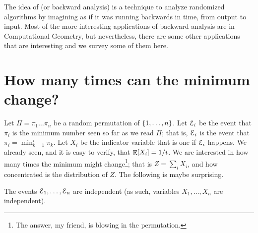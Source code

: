 %


\ChapterPrefix{}
\ChapterGen{}


The idea of  (or backward analysis) is a
technique to analyze randomized algorithms by imagining as if it was
running backwards in time, from output to input. Most of the more
interesting applications of backward analysis are in Computational
Geometry, but nevertheless, there are some other applications that are
interesting and we survey some of them here.


\section{How many times can the minimum change?}


Let $\Pi = \pi_1 \ldots \pi_n$ be a random permutation of
$\left\{ {1, \ldots, n} \right\}$. Let $\EuScript{E}_i$ be the event that $\pi_i$ is the
minimum number seen so far as we read $\Pi$; that is, $\EuScript{E}_i$ is
the event that $\pi_i = \min_{k=1}^i \pi_k$. Let $X_i$ be the
indicator variable that is one if $\EuScript{E}_i$ happens. We already seen,
and it is easy to verify, that $\mathop{\mathbb{E}}\!\left[ {X_i} \right] = 1/i$. We are interested in
how many times the minimum might change\footnote{The answer, my
   friend, is blowing in the permutation.}; that is $Z=\sum_i X_i$,
and how concentrated is the distribution of $Z$.  The following is
maybe surprising.

\begin{lemma}%
    The events $\EuScript{E}_1, \ldots, \EuScript{E}_n$ are independent (as such,
    variables $X_1, \ldots, X_n$ are independent).
\end{lemma}

